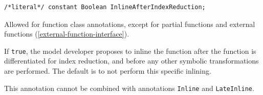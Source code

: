 \begin{annotationdefinition}[InlineAfterIndexReduction]
\begin{synopsis}\begin{lstlisting}
/*literal*/ constant Boolean InlineAfterIndexReduction;
\end{lstlisting}\end{synopsis}
\begin{semantics}
Allowed for function class annotations, except for partial functions and external functions (\cref{external-function-interface}).

If {\lstinline!true!}, the model developer proposes to inline the function after the function is differentiated for index reduction, and before any other symbolic transformations are performed.
The default is to not perform this specific inlining.

This annotation cannot be combined with annotations {\lstinline!Inline!} and {\lstinline!LateInline!}.
\end{semantics}
\end{annotationdefinition}

